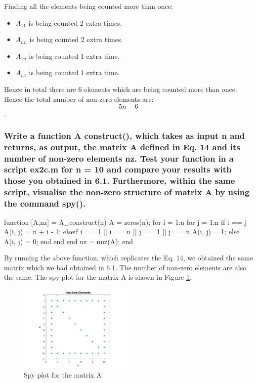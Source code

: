\documentclass[unicode,11pt,a4paper,oneside,numbers=endperiod,openany]{scrartcl}
\begin{document}
Finding all the elements being counted more than once:

\begin{itemize}
    \item $A_{11}$ is being counted 2 extra times.
    \item $A_{nn}$ is being counted 2 extra times.
    \item $A_{1n}$ is being counted 1 extra time.
    \item $A_{n1}$ is being counted 1 extra time.
\end{itemize}

Hence in total there are 6 elements which are being counted more than once. Hence the total number of non-zero elements are: $$5n - 6$$.

\subsubsection{Write a function A construct(), which takes as input n and returns, as output, the matrix A defined in Eq. 14 and its number of non-zero elements nz. Test your function in a script ex2c.m for n = 10 and compare your results with those you obtained in 6.1. Furthermore, within the same script, visualise the non-zero structure of matrix A by using the command spy().}

\begin{mcode}
    function [A,nz] = A_construct(n)
        A = zeros(n);       %
        for i = 1:n         %
            for j = 1:n     %
                if i == j
                    A(i, j) = n + i - 1;
                elseif i == 1 || i == n || j == 1 || j == n
                    A(i, j) = 1;
                else
                    A(i, j) = 0;
                end
            end
        end
    nz = nnz(A);
    end
\end{mcode}

By running the above function, which replicates the Eq. 14, we obtained the same matrix which we had obtained in 6.1. The number of non-zero elements are also the same. The spy plot for the matrix A is shown in Figure \ref{fig:spy-plot}.

\begin{figure}[H]
    \centering
    \includegraphics[width=0.5\textwidth]{images/nbyn.jpg}
    \caption{Spy plot for the matrix A}
    \label{fig:spy-plot}
\end{figure}
\end{document}
